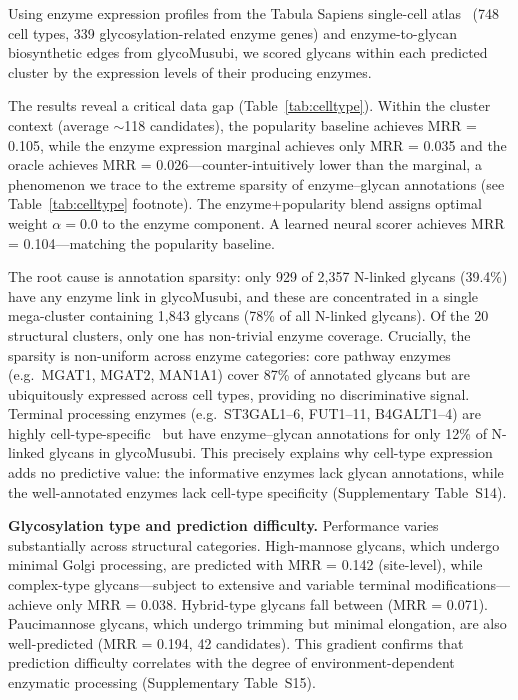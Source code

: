 \documentclass[11pt,a4paper]{article}
\begin{document}
Using enzyme expression profiles from the Tabula Sapiens single-cell
atlas~\cite{tabulasapiens2022} (748 cell types, 339 glycosylation-related
enzyme genes) and enzyme-to-glycan biosynthetic edges from glycoMusubi, we scored
glycans within each predicted cluster by the expression levels of their
producing enzymes.

The results reveal a critical data gap (Table~\ref{tab:celltype}). Within the
cluster context (average $\sim$118 candidates), the popularity baseline achieves
MRR = 0.105, while the enzyme expression marginal achieves only MRR = 0.035 and
the oracle achieves MRR = 0.026---counter-intuitively lower than the marginal, a phenomenon we trace to the extreme sparsity of enzyme--glycan annotations (see Table~\ref{tab:celltype} footnote). The enzyme+popularity blend assigns optimal
weight $\alpha = 0.0$ to the enzyme component. A learned neural scorer achieves
MRR = 0.104---matching the popularity baseline.

The root cause is annotation sparsity: only 929 of 2,357 N-linked glycans
(39.4\%) have any enzyme link in glycoMusubi, and these are concentrated in a
single mega-cluster containing 1,843 glycans (78\% of all N-linked glycans).
Of the 20 structural clusters, only one has non-trivial enzyme coverage.
Crucially, the sparsity is non-uniform across enzyme categories: core pathway
enzymes (e.g.\ MGAT1, MGAT2, MAN1A1) cover 87\% of annotated glycans but are
ubiquitously expressed across cell types, providing no discriminative signal.
Terminal processing enzymes (e.g.\ ST3GAL1--6, FUT1--11, B4GALT1--4) are highly
cell-type-specific~\cite{chrysinas2024} but have enzyme--glycan annotations for
only 12\% of N-linked glycans in glycoMusubi. This precisely explains why cell-type
expression adds no predictive value: the informative enzymes lack glycan
annotations, while the well-annotated enzymes lack cell-type specificity
(Supplementary Table~S14).

\textbf{Glycosylation type and prediction difficulty.} Performance varies
substantially across structural categories. High-mannose glycans, which undergo
minimal Golgi processing, are predicted with MRR = 0.142 (site-level), while
complex-type glycans---subject to extensive and variable terminal
modifications---achieve only MRR = 0.038. Hybrid-type glycans fall between
(MRR = 0.071). Paucimannose glycans, which undergo trimming but minimal
elongation, are also well-predicted (MRR = 0.194, 42 candidates). This
gradient confirms that prediction difficulty correlates with the degree of
environment-dependent enzymatic processing (Supplementary Table~S15).
\end{document}

